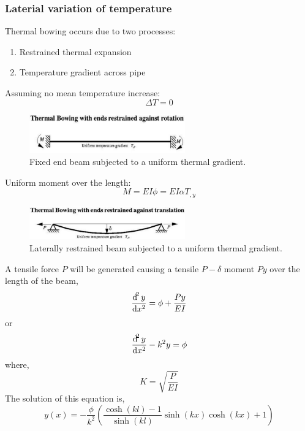 \subsubsection{Laterial variation of temperature}
Thermal bowing occurs due to two processes:
\begin{enumerate}
    \item Restrained thermal expansion
    \item Temperature gradient across pipe
\end{enumerate}
Assuming no mean temperature increase:
\begin{equation}
    \Delta T = 0
\end{equation}
\begin{figure}[H]
    \centering
    \includegraphics[width = 0.6\textwidth]{img/figure60.png}
    \caption{Fixed end beam subjected to a uniform thermal gradient.}
\end{figure}
Uniform moment over the length:
\begin{equation}
    M = EI \phi = EI\alpha T_{,y}
\end{equation}
\begin{figure}[H]
    \centering
    \includegraphics[width = 0.6\textwidth]{img/figure61.png}
    \caption{Laterally restrained beam subjected to a uniform thermal gradient.}
\end{figure}
A tensile force $P$ will be generated causing a tensile $P-\delta$ moment $Py$ over the length of the beam,
\begin{equation}
    \frac{\dif^2 y}{\dif x^2} = \phi + \frac{Py}{EI}
\end{equation}
or
\begin{equation}
    \frac{\dif^2 y}{\dif x^2} - k^2 y = \phi
\end{equation}
where,
\begin{equation}
    K = \sqrt{\frac{P}{EI}}
\end{equation}
The solution of this equation is,
\begin{equation}
    y\left(x\right) = -\frac{\phi}{k^2}\left(\frac{\cosh\left(kl\right) - 1}{\sinh\left(kl\right)}\sinh\left(kx\right)\cosh\left(kx\right)+1\right)
\end{equation}
